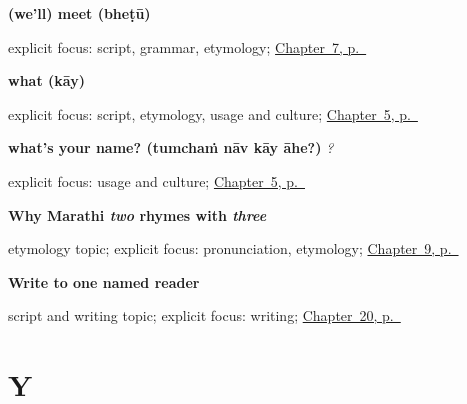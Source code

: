 \noindent\begin{minipage}[t]{\linewidth}
\raggedright
\textbf{(we'll) meet (bheṭū)}\enspace\emph{}\par
\footnotesize explicit focus: script, grammar, etymology; \hyperref[ch:farewells]{Chapter~7, p.~\pageref*{ch:farewells}}
\end{minipage}\par\smallskip

\noindent\begin{minipage}[t]{\linewidth}
\raggedright
\textbf{what (kāy)}\enspace\emph{}\par
\footnotesize explicit focus: script, etymology, usage and culture; \hyperref[ch:introductions]{Chapter~5, p.~\pageref*{ch:introductions}}
\end{minipage}\par\smallskip

\noindent\begin{minipage}[t]{\linewidth}
\raggedright
\textbf{what's your name? (tumchaṁ nāv kāy āhe?)}\enspace\emph{   ?}\par
\footnotesize explicit focus: usage and culture; \hyperref[ch:introductions]{Chapter~5, p.~\pageref*{ch:introductions}}
\end{minipage}\par\smallskip

\noindent\begin{minipage}[t]{\linewidth}
\raggedright
\textbf{Why Marathi \emph{two} rhymes with \emph{three}}\par
\footnotesize etymology topic; explicit focus: pronunciation, etymology; \hyperref[ch:numbers-one-to-five]{Chapter~9, p.~\pageref*{ch:numbers-one-to-five}}
\end{minipage}\par\smallskip

\noindent\begin{minipage}[t]{\linewidth}
\raggedright
\textbf{Write to one named reader}\par
\footnotesize script and writing topic; explicit focus: writing; \hyperref[ch:mr-a1-named-reader-message]{Chapter~20, p.~\pageref*{ch:mr-a1-named-reader-message}}
\end{minipage}\par\smallskip

\section*{Y}

